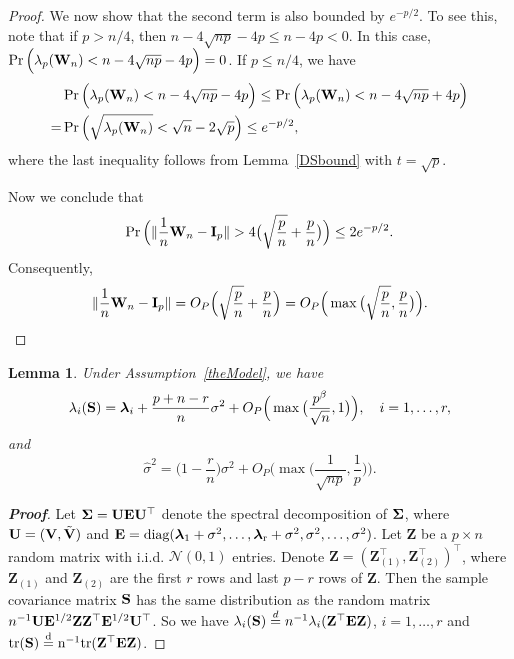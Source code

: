 \documentclass[times,sort&compress,3p]{elsarticle}
\newcommand{\mytr}{\rm tr}
\newcommand{\mydiag}{\rm diag}
\newcommand{\bZ}{\mathbf{Z}}
\newcommand{\bfsym}[1]{\ensuremath{\boldsymbol{#1}}}
\def\blambda {\bfsym {\lambda}}        \def\bLambda {\bfsym {\Lambda}}
\theoremstyle{plain}
\newtheorem{lemma}{\quad\quad Lemma}
\theoremstyle{definition}
\theoremstyle{remark}
\begin{document}
\begin{appendices}
\begin{proof}
    We now show that the second term is also bounded by $e^{-p/2}$.
    To see this, note that if $p>n/4$, then $n-4\sqrt{np}-4p\leq n-4p<0$.
    In this case, $\Pr\Big(\lambda_p(\mathbf{W}_n)<n-4\sqrt{np}-4p\Big)=0$.
    If $p\leq n/4$, we have
    $$
    \begin{aligned}
        &\Pr\Big(\lambda_p(\mathbf{W}_n)<n-4\sqrt{np}-4p\Big)
    \leq
    \Pr\Big(\lambda_p(\mathbf{W}_n)<n-4\sqrt{np}+4p\Big)\\
        =&
    \Pr\Big(\sqrt{\lambda_p(\mathbf{W}_n)}<\sqrt{n}-2\sqrt{p}\Big)
        \leq e^{-p/2},
    \end{aligned}
    $$
    where the last inequality follows from Lemma~\ref{DSbound} with $t=\sqrt{p}$.

    Now we conclude that
    $$
    \Pr\Big(\|\frac{1}{n}\BW_n-\BI_p\|>4\big(\sqrt{\frac{p}{n}}+\frac{p}{n}\big)\Big)
    \leq 2 e^{-p/2}.
    $$
    Consequently,
    $$\|\frac{1}{n}\mathbf{W}_n-\mathbf{I}_p\|=O_P\Big(\sqrt{\frac{p}{n}}+\frac{p}{n}\Big)=O_P\Big(\max\big(\sqrt{\frac{p}{n}},\frac{p}{n}\big)\Big).$$
\end{proof}



\begin{lemma}\label{eigenconsisLemma}
    Under Assumption~\ref{theModel}, we have
    \begin{equation}\label{eigenconsisResult1}
        \lambda_i(\BS)= \blambda_i+\frac{p+n-r}{n}\sigma^2+
        O_P\Big(\max\big(\frac{p^{\beta}}{\sqrt{n}},1\big)\Big),\quad i=1,\ldots, r,
    \end{equation}
    and
    \begin{equation}\label{eigenconsisResult2}
        \hat{\sigma}^2=
\big(1-\frac{r}{n}\big)\sigma^2+
O_P\Big(\max\big(\frac{1}{\sqrt{np}},\frac{1}{p}\big)\Big).
    \end{equation}
\end{lemma}
\begin{proof}[\textbf{Proof}]
    Let $\bSigma=\BU\BE\BU^\top $ denote the spectral decomposition of $\bSigma$, where
     $\mathbf{U}=(\mathbf{V},\tilde{\mathbf{V}})$ and $\BE=\mydiag(\blambda_1+\sigma^2,\ldots,\blambda_r+\sigma^2,\sigma^2,\ldots,\sigma^2)$.
    Let $\bZ$ be a $p\times n$ random matrix with i.i.d. $\mathcal{N}(0,1)$ entries.
Denote $\bZ={(\bZ_{(1)}^\top ,\bZ_{(2)}^\top )}^\top $, where $\bZ_{(1)}$ and $\bZ_{(2)}$ are the first $r$ rows and last $p-r$ rows of $\bZ$. 
Then the sample covariance matrix $\mathbf{S}$ has the same distribution as the random matrix
$
    n^{-1} \BU \BE^{1/2} \bZ \bZ^\top  \BE^{1/2} \BU^\top 
$.
    So we have $\lambda_i(\BS)\overset{d}{=} n^{-1}\lambda_i(\bZ^\top  \BE \bZ)$, $i=1,\ldots,r$ and $\mytr(\BS)\overset{d}{=} n^{-1}\mytr(\BZ^\top  \BE \BZ)$.


\end{proof}
\end{appendices}
\end{document}
